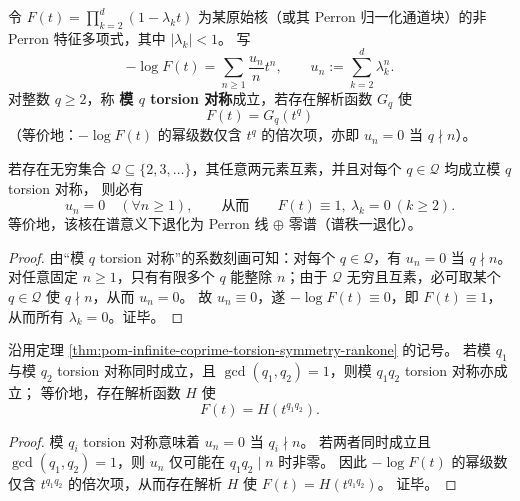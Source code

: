 \begin{theorem}\label{thm:pom-infinite-coprime-torsion-symmetry-rankone}
令 \(F(t)=\prod_{k=2}^{d}(1-\lambda_k t)\) 为某原始核（或其 Perron 归一化通道块）的非 Perron 特征多项式，其中 \(|\lambda_k|<1\)。
写
\[
-\log F(t)=\sum_{n\ge 1}\frac{u_n}{n}t^n,
\qquad
u_n:=\sum_{k=2}^{d}\lambda_k^n.
\]
对整数 \(q\ge 2\)，称 \textbf{模 \(q\) torsion 对称}成立，若存在解析函数 \(G_q\) 使
\[
\boxed{\;F(t)=G_q(t^q)\;}
\]
（等价地：\(-\log F(t)\) 的幂级数仅含 \(t^{q}\) 的倍次项，亦即 \(u_n=0\) 当 \(q\nmid n\)）。
\par
若存在无穷集合 \(\mathcal Q\subseteq\{2,3,\dots\}\)，其任意两元素互素，并且对每个 \(q\in\mathcal Q\) 均成立模 \(q\) torsion 对称，
则必有
\[
u_n=0\quad(\forall n\ge 1),
\qquad\text{从而}\qquad
F(t)\equiv 1,\ \lambda_k=0\ (k\ge 2).
\]
等价地，该核在谱意义下退化为 Perron 线 \(\oplus\) 零谱（谱秩一退化）。
\end{theorem}
\begin{proof}
由“模 \(q\) torsion 对称”的系数刻画可知：对每个 \(q\in\mathcal Q\)，有 \(u_n=0\) 当 \(q\nmid n\)。
对任意固定 \(n\ge 1\)，只有有限多个 \(q\) 能整除 \(n\)；由于 \(\mathcal Q\) 无穷且互素，必可取某个 \(q\in\mathcal Q\) 使 \(q\nmid n\)，从而 \(u_n=0\)。
故 \(u_n\equiv 0\)，遂 \(-\log F(t)\equiv 0\)，即 \(F(t)\equiv 1\)，从而所有 \(\lambda_k=0\)。证毕。
\end{proof}

\begin{corollary}[有限 torsion 对称的互素乘法闭合：两互素对称同时成立 \texorpdfstring{$\Rightarrow$}{=>} 乘积对称成立]\label{cor:pom-torsion-symmetry-coprime-closure}
沿用定理 \ref{thm:pom-infinite-coprime-torsion-symmetry-rankone} 的记号。
若模 \(q_1\) 与模 \(q_2\) torsion 对称同时成立，且 \(\gcd(q_1,q_2)=1\)，则模 \(q_1q_2\) torsion 对称亦成立；
等价地，存在解析函数 \(H\) 使
\[
F(t)=H\!\left(t^{q_1q_2}\right).
\]
\end{corollary}
\begin{proof}
模 \(q_i\) torsion 对称意味着 \(u_n=0\) 当 \(q_i\nmid n\)。
若两者同时成立且 \(\gcd(q_1,q_2)=1\)，则 \(u_n\) 仅可能在 \(q_1q_2\mid n\) 时非零。
因此 \(-\log F(t)\) 的幂级数仅含 \(t^{q_1q_2}\) 的倍次项，从而存在解析 \(H\) 使 \(F(t)=H(t^{q_1q_2})\)。
证毕。
\end{proof}



